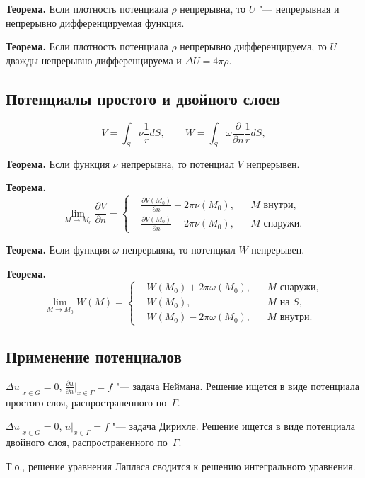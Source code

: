 \documentclass[a4paper,12pt]{article}
\begin{document}
\textbf{Теорема.} Если плотность потенциала $\rho$ непрерывна,
то $U$ "--- непрерывная и непрерывно дифференцируемая функция.

\textbf{Теорема.} Если плотность потенциала $\rho$ непрерывно дифференцируема,
то $U$ дважды непрерывно дифференцируема и $\Delta U=4\pi\rho$.


\subsection{Потенциалы простого и двойного слоев}

$$V=\int_S\nu\frac{1}{r}dS,\qquad 
  W=\int_S\omega\frac{\partial}{\partial n}\frac{1}{r}dS,$$

\textbf{Теорема.} Если функция $\nu$ непрерывна, то потенциал $V$
непрерывен.

\textbf{Теорема.}
$$
\lim_{M\to M_0}\frac{\partial V}{\partial n}=\left\{\begin{aligned}
&\frac{\partial V(M_0)}{\partial n}+2\pi\nu(M_0), &&\text{$M$ внутри},\\
&\frac{\partial V(M_0)}{\partial n}-2\pi\nu(M_0), &&\text{$M$ снаружи}.
\end{aligned}\right.
$$

\textbf{Теорема.} Если функция $\omega$ непрерывна, то потенциал $W$
непрерывен.

\textbf{Теорема.}
$$
\lim_{M\to M_0}W(M)=\left\{\begin{aligned}
&W(M_0)+2\pi\omega(M_0), &&\text{$M$ снаружи},\\
&W(M_0), &&\text{$M$ на $S$},\\
&W(M_0)-2\pi\omega(M_0), &&\text{$M$ внутри}.
\end{aligned}\right.
$$


\subsection{Применение потенциалов}

$\Delta u|_{x\in G}=0$, $\frac{\partial u}{\partial n}|_{x\in\Gamma}=f$
"--- задача Неймана. Решение ищется в виде потенциала простого слоя,
распространенного по~$\Gamma$.

$\Delta u|_{x\in G}=0$, $u|_{x\in\Gamma}=f$ "--- задача Дирихле.
Решение ищется в виде потенциала двойного слоя, распространенного
по~$\Gamma$.

Т.о., решение уравнения Лапласа сводится к решению интегрального уравнения.
\end{document}
